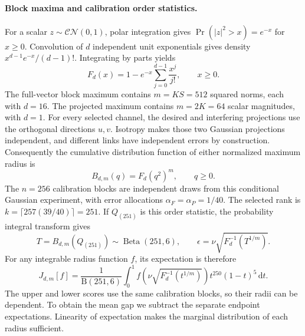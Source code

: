 \documentclass[10pt,letterpaper]{article}
\begin{document}
\paragraph{Block maxima and calibration order statistics.}
For a scalar \(z\sim\mathcal{CN}(0,1)\), polar integration gives
\(\Pr(|z|^2>x)=e^{-x}\) for \(x\geq0\). Convolution of \(d\) independent unit exponentials gives density \(x^{d-1}e^{-x}/(d-1)!\). Integrating by parts yields
\begin{equation}
 F_d(x)=1-e^{-x}\sum_{j=0}^{d-1}\frac{x^j}{j!},\qquad x\geq0.
 \label{supp:eq:erlang}
\end{equation}
The full-vector block maximum contains \(m=KS=512\) squared norms, each with \(d=16\). The projected maximum contains \(m=2K=64\) scalar magnitudes, with \(d=1\). For every selected channel, the desired and interfering projections use the orthogonal directions \(u,v\). Isotropy makes those two Gaussian projections independent, and different links have independent errors by construction. Consequently the cumulative distribution function of either normalized maximum radius is
\begin{equation}
 B_{d,m}(q)=F_d(q^2)^m,\qquad q\geq0.
 \label{supp:eq:blockcdf}
\end{equation}
The \(n=256\) calibration blocks are independent draws from this conditional Gaussian experiment, with error allocations \(\alpha_F=\alpha_P=1/40\). The selected rank is \(k=\lceil257(39/40)\rceil=251\). If \(Q_{(251)}\) is this order statistic, the probability integral transform gives
\begin{equation}
 T=B_{d,m}(Q_{(251)})\sim\operatorname{Beta}(251,6),\qquad
 \epsilon=\nu\sqrt{F_d^{-1}(T^{1/m})}.
 \label{supp:eq:betaradius}
\end{equation}
For any integrable radius function \(f\), its expectation is therefore
\begin{equation}
 J_{d,m}[f]=
 \frac{1}{\mathrm B(251,6)}
 \int_0^1
 f\!\left(\nu\sqrt{F_d^{-1}(t^{1/m})}\right)
 t^{250}(1-t)^5\,\mathrm dt.
 \label{supp:eq:gaussintegral}
\end{equation}
The upper and lower scores use the same calibration blocks, so their radii can be dependent. To obtain the mean gap we subtract the separate endpoint expectations. Linearity of expectation makes the marginal distribution of each radius sufficient.
\end{document}
